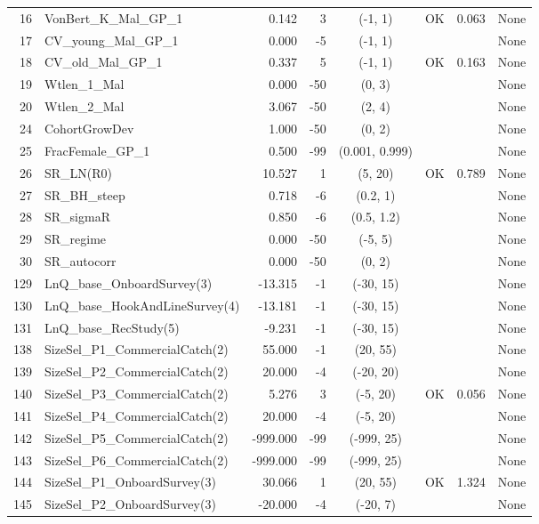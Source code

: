 \documentclass[12pt,]{article}
\begin{document}
\begin{landscape}
\begin{longtable}{rlrrcccl}
  16 & VonBert\_K\_Mal\_GP\_1 & 0.142 & 3 & (-1, 1) & OK & 0.063 & None \\ 
  17 & CV\_young\_Mal\_GP\_1 & 0.000 & -5 & (-1, 1) &  &  & None \\ 
  18 & CV\_old\_Mal\_GP\_1 & 0.337 & 5 & (-1, 1) & OK & 0.163 & None \\ 
  19 & Wtlen\_1\_Mal & 0.000 & -50 & (0, 3) &  &  & None \\ 
  20 & Wtlen\_2\_Mal & 3.067 & -50 & (2, 4) &  &  & None \\ 
  24 & CohortGrowDev & 1.000 & -50 & (0, 2) &  &  & None \\ 
  25 & FracFemale\_GP\_1 & 0.500 & -99 & (0.001, 0.999) &  &  & None \\ 
  26 & SR\_LN(R0) & 10.527 & 1 & (5, 20) & OK & 0.789 & None \\ 
  27 & SR\_BH\_steep & 0.718 & -6 & (0.2, 1) &  &  & None \\ 
  28 & SR\_sigmaR & 0.850 & -6 & (0.5, 1.2) &  &  & None \\ 
  29 & SR\_regime & 0.000 & -50 & (-5, 5) &  &  & None \\ 
  30 & SR\_autocorr & 0.000 & -50 & (0, 2) &  &  & None \\ 
  129 & LnQ\_base\_OnboardSurvey(3) & -13.315 & -1 & (-30, 15) &  &  & None \\ 
  130 & LnQ\_base\_HookAndLineSurvey(4) & -13.181 & -1 & (-30, 15) &  &  & None \\ 
  131 & LnQ\_base\_RecStudy(5) & -9.231 & -1 & (-30, 15) &  &  & None \\ 
  138 & SizeSel\_P1\_CommercialCatch(2) & 55.000 & -1 & (20, 55) &  &  & None \\ 
  139 & SizeSel\_P2\_CommercialCatch(2) & 20.000 & -4 & (-20, 20) &  &  & None \\ 
  140 & SizeSel\_P3\_CommercialCatch(2) & 5.276 & 3 & (-5, 20) & OK & 0.056 & None \\ 
  141 & SizeSel\_P4\_CommercialCatch(2) & 20.000 & -4 & (-5, 20) &  &  & None \\ 
  142 & SizeSel\_P5\_CommercialCatch(2) & -999.000 & -99 & (-999, 25) &  &  & None \\ 
  143 & SizeSel\_P6\_CommercialCatch(2) & -999.000 & -99 & (-999, 25) &  &  & None \\ 
  144 & SizeSel\_P1\_OnboardSurvey(3) & 30.066 & 1 & (20, 55) & OK & 1.324 & None \\ 
  145 & SizeSel\_P2\_OnboardSurvey(3) & -20.000 & -4 & (-20, 7) &  &  & None \\ 

\end{longtable}
\end{landscape}
\end{document}
